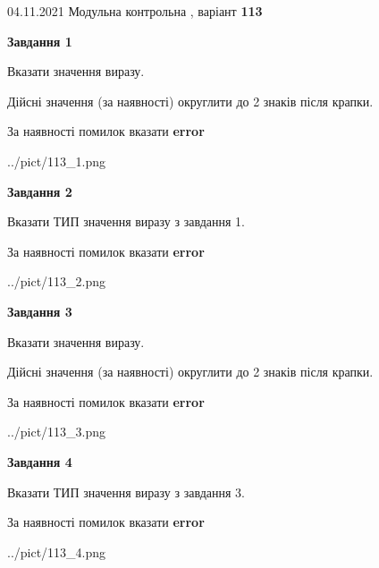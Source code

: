 \documentclass[11pt, ukrainian]{article}
\begin{document}
{04.11.2021 Модульна контрольна , варіант  \No \textbf { 113 }\par}
{
\begin {large}
{\begin {center}\textbf{Завдання 1}\end {center}}\par
Вказати значення виразу. \par
Дійсні значення (за наявності) округлити до 2 знаків після крапки. \par
За наявності помилок вказати \textbf{error}

\begin{center}
	{../pict/113_1.png}
\end{center}
\newpage

{\begin {center}\textbf{Завдання 2}\end {center}}\par
Вказати ТИП значення виразу з завдання 1. \par
За наявності помилок вказати \textbf{error}

\begin{center}
	{../pict/113_2.png}
\end{center}
\newpage

{\begin {center}\textbf{Завдання 3}\end {center}}\par
Вказати значення виразу. \par
Дійсні значення (за наявності) округлити до 2 знаків після крапки. \par
За наявності помилок вказати \textbf{error}

\begin{center}
	{../pict/113_3.png}
\end{center}
\newpage

{\begin {center}\textbf{Завдання 4}\end {center}}\par
Вказати ТИП значення виразу з завдання 3. \par
За наявності помилок вказати \textbf{error}

\begin{center}
	{../pict/113_4.png}
\end{center}
\newpage


\end{large}}
\end{document}

